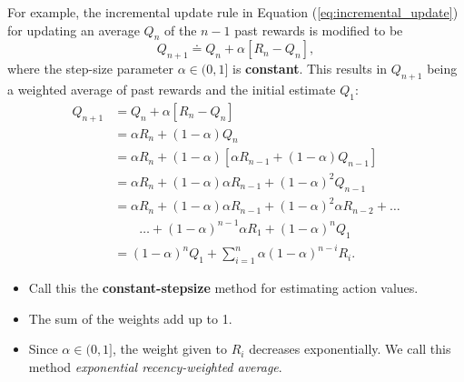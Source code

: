 For example, the incremental update rule in Equation (\ref{eq:incremental_update}) for updating an average $Q_n$ of the $n-1$ past rewards is modified to be
\begin{equation}
Q_{n+1} \doteq Q_n + \alpha [R_n - Q_n] , 
\end{equation}
where the step-size parameter $\alpha \in (0, 1]$ is \textbf{constant}. This results in $Q_{n+1}$ being a weighted average of past rewards and the initial estimate $Q_1$:
\begin{align}
Q_{n+1} &= Q_n + \alpha [R_n - Q_n] \nonumber \\
&= \alpha R_n + (1-\alpha)Q_n \nonumber \\
&= \alpha R_n + (1-\alpha)[\alpha R_{n-1} + (1-\alpha)Q_{n-1}] \nonumber \\
&= \alpha R_n + (1-\alpha)\alpha R_{n-1} + (1-\alpha)^2 Q_{n-1} \nonumber \\
&= \alpha R_n + (1-\alpha)\alpha R_{n-1} + (1-\alpha)^2 \alpha R_{n-2} + \dots \nonumber \\
& \qquad \dots + (1-\alpha)^{n-1} \alpha R_1 + (1-\alpha)^n Q_1 \nonumber \\
&= (1-\alpha)^n Q_1 + \sum_{i=1}^{n} \alpha (1-\alpha)^{n-i} R_i . 
\label{eq:constant_stepsize_update}
\end{align}


\begin{itemize}
\item Call this the \textbf{constant-stepsize} method for estimating action values.
\item The sum of the weights add up to 1. 
\item Since $\alpha \in (0, 1]$, the weight given to \(R_i\) decreases exponentially. We call this method \textit{exponential recency-weighted average}.
\end{itemize}






